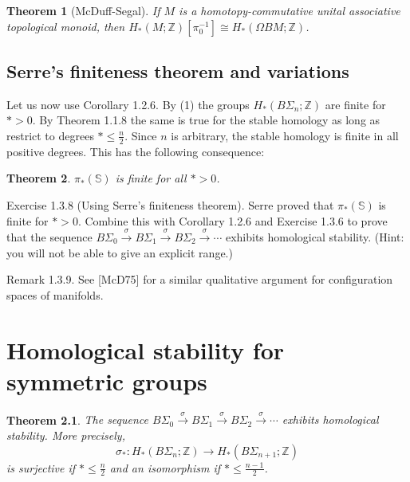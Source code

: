 \documentclass{book}
\newtheorem{theo}{Theorem}
\begin{document}
\begin{theo}[McDuff-Segal]
     If $M$ is a homotopy-commutative unital associative topological monoid, then $H_*(M ; \mathbb{Z})\left[\pi_0^{-1}\right] \cong H_*(\Omega B M ; \mathbb{Z})$.    
\end{theo}


\section{Serre's finiteness theorem and variations}

Let us now use Corollary 1.2.6. By (1) the groups $H_*\left(B \Sigma_n ; \mathbb{Z}\right)$ are finite for $*>0$. By Theorem 1.1.8 the same is true for the stable homology as long as restrict to degrees $* \leq \frac{n}{2}$. Since $n$ is arbitrary, the stable homology is finite in all positive degrees. This has the following consequence:

\begin{theo}
$\pi_*(\mathbb{S})$ is finite for all $*>0$.
\end{theo}


Exercise 1.3.8 (Using Serre's finiteness theorem). Serre proved that $\pi_*(\mathbb{S})$ is finite for $*>0$. Combine this with Corollary 1.2.6 and Exercise 1.3.6 to prove that the sequence $B \Sigma_0 \xrightarrow{\sigma} B \Sigma_1 \xrightarrow{\sigma} B \Sigma_2 \xrightarrow{\sigma} \cdots$ exhibits homological stability. (Hint: you will not be able to give an explicit range.)

Remark 1.3.9. See [McD75] for a similar qualitative argument for configuration spaces of manifolds.


\chapter{Homological stability for symmetric groups}

\begin{theo}
The sequence $B \Sigma_0 \xrightarrow{\sigma} B \Sigma_1 \xrightarrow{\sigma} B \Sigma_2 \xrightarrow{\sigma} \cdots$ exhibits homological stability. More precisely,
$$
\sigma_*: H_*\left(B \Sigma_n ; \mathbb{Z}\right) \longrightarrow H_*\left(B \Sigma_{n+1} ; \mathbb{Z}\right)
$$
is surjective if $* \leq \frac{n}{2}$ and an isomorphism if $* \leq \frac{n-1}{2}$.
\end{theo}









\printbibliography %
\end{document}
